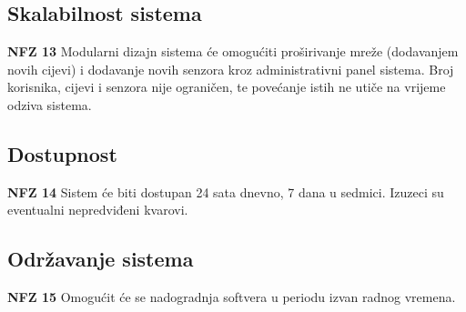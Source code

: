 \documentclass[]{report}
\begin{document}
\subsection{Skalabilnost sistema}

\begin{compactitem}

\item \textbf{NFZ 13} Modularni dizajn sistema će omogućiti proširivanje mreže (dodavanjem novih cijevi) i dodavanje novih senzora kroz administrativni panel sistema. Broj korisnika, cijevi i senzora nije ograničen, te povećanje istih ne utiče na vrijeme odziva sistema.

\end{compactitem}

\subsection{Dostupnost}

\begin{compactitem}
\item \textbf{NFZ 14} Sistem će biti dostupan 24 sata dnevno, 7 dana u sedmici. Izuzeci su eventualni nepredviđeni kvarovi.
\end{compactitem}

\subsection{Održavanje sistema}

\begin{compactitem}
\item \textbf{NFZ 15} Omogućit će se nadogradnja softvera u periodu izvan radnog vremena.

\end{compactitem}
\end{document}
